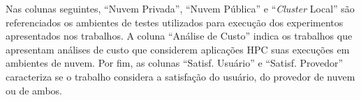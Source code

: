 \documentclass[tese,capa]{texufpel}
\begin{document}
Nas colunas seguintes, ``Nuvem Privada'', ``Nuvem Pública'' e ``\textit{Cluster} Local'' são referenciados os ambientes de testes utilizados para execução dos experimentos apresentados nos trabalhos. A coluna ``Análise de Custo'' indica os trabalhos que apresentam análises de custo que considerem aplicações HPC suas execuções em ambientes de nuvem. Por fim, as colunas ``Satisf. Usuário'' e ``Satisf. Provedor'' caracteriza se o trabalho considera a satisfação do usuário, do provedor de nuvem ou de ambos.


\begin{table}[H]
  \footnotesize
  \centering
  \caption{Abordagens adotadas pelos trabalhos relacionados}
  \label{tab:trabrel}
\end{table}
\end{document}

